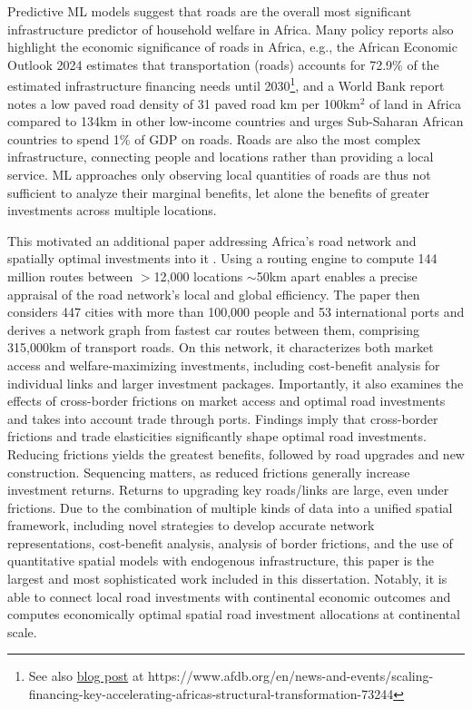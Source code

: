 \documentclass[a4paper]{article}
\begin{document}
Predictive ML models suggest that roads are the overall most significant infrastructure predictor of household welfare in Africa. Many policy reports also highlight the economic significance of roads in Africa, e.g., the African Economic Outlook 2024 \citep{african2024driving} estimates that transportation (roads) accounts for 72.9\% of the estimated infrastructure financing needs until 2030\footnote{See also \href{https://www.afdb.org/en/news-and-events/scaling-financing-key-accelerating-africas-structural-transformation-73244}{blog post} at https://www.afdb.org/en/news-and-events/scaling-financing-key-accelerating-africas-structural-transformation-73244 \vspace{-3mm}}, and a World Bank report \citep{foster2010africa} notes a low paved road density of 31 paved road km per 100km$^2$ of land in Africa compared to 134km in other low-income countries and urges Sub-Saharan African countries to spend 1\% of GDP on roads. Roads are also the most complex infrastructure, connecting people and locations rather than providing a local service. ML approaches only observing local quantities of roads are thus not sufficient to analyze their marginal benefits, let alone the benefits of greater investments across multiple locations. \newline

This motivated an additional paper addressing Africa's road network and spatially optimal investments into it \citep{krantz2024optimal}. Using a routing engine to compute 144 million routes between $>$12,000 locations $\sim$50km apart enables a precise appraisal of the road network's local and global efficiency. The paper then considers 447 cities with more than 100,000 people and 53 international ports and derives a network graph from fastest car routes between them, comprising 315,000km of transport roads. On this network, it characterizes both market access and welfare-maximizing investments, including cost-benefit analysis for individual links and larger investment packages. Importantly, it also examines the effects of cross-border frictions on market access and optimal road investments and takes into account trade through ports. Findings imply that cross-border frictions and trade elasticities significantly shape optimal road investments. Reducing frictions yields the greatest benefits, followed by road upgrades and new construction. Sequencing matters, as reduced frictions generally increase investment returns. Returns to upgrading key roads/links are large, even under frictions. Due to the combination of multiple kinds of data into a unified spatial framework, including novel strategies to develop accurate network representations, cost-benefit analysis, analysis of border frictions, and the use of quantitative spatial models with endogenous infrastructure, this paper is the largest and most sophisticated work included in this dissertation. Notably, it is able to connect local road investments with continental economic outcomes and computes economically optimal spatial road investment allocations at continental scale. \newline
\end{document}
